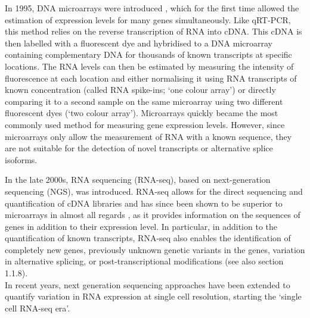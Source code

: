 In 1995, DNA microarrays were introduced \cite{schena1995quantitative}, which for the first time allowed the estimation of expression levels for many genes simultaneously.
Like qRT-PCR, this method relies on the reverse transcription of RNA into cDNA.
This cDNA is then labelled with a fluorescent dye and hybridised to a DNA microarray containing complementary DNA for thousands of known transcripts at specific locations. 
The RNA levels can then be estimated by measuring the intensity of fluorescence at each location and either normalising it using RNA transcripts of known concentration (called RNA spike-ins; `one colour array') or directly comparing it to a second sample on the same microarray using two different fluorescent dyes (`two colour array').
Microarrays quickly became the most commonly used method for measuring gene expression levels. 
However, since microarrays only allow the measurement of RNA with a known sequence, they are not suitable for the detection of novel transcripts or alternative splice isoforms. 

In the late 2000s, RNA sequencing (RNA-seq), based on next-generation sequencing (NGS), 
was introduced.
RNA-seq allows for the direct sequencing and quantification of cDNA libraries \cite{mortazavi2008mapping} and has since been shown to be superior to microarrays in almost all regards 
\cite{marioni2008rna}, as it provides information on the sequences of genes in addition to their expression level.
In particular, in addition to the quantification of known transcripts, RNA-seq also enables the identification of completely new genes, previously unknown genetic variants in the genes, variation in alternative splicing, or post-transcriptional modifications (see also section 
1.1.8). \\

In recent years, next generation sequencing approaches have been extended to quantify variation in RNA expression at single cell resolution, starting the `single cell RNA-seq era'.


